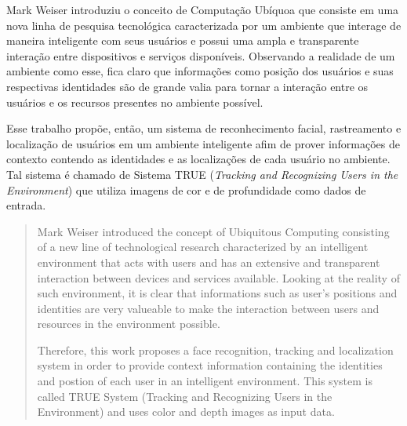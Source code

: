 \begin{resumo}

	Mark Weiser introduziu o conceito de Computação Ubíquoa que consiste em uma nova linha de pesquisa tecnológica caracterizada por um ambiente que interage de maneira inteligente com seus usuários e possui uma ampla e transparente interação entre dispositivos e serviços disponíveis. Observando a realidade de um ambiente como esse, fica claro que informações como posição dos usuários e suas respectivas identidades são de grande valia para tornar a interação entre os usuários e os recursos presentes no ambiente possível.

	Esse trabalho propõe, então, um sistema de reconhecimento facial, rastreamento e localização de usuários em um ambiente inteligente afim de prover informações de contexto contendo as identidades e as localizações de cada usuário no ambiente. Tal sistema é chamado de Sistema TRUE (\textit{Tracking and Recognizing Users in the Environment}) que utiliza imagens de cor e de profundidade como dados de entrada.

\end{resumo}


\begin{abstract}
	
	Mark Weiser introduced the concept of Ubiquitous Computing consisting of a new line of technological research characterized by an intelligent environment that acts with users and has an extensive and transparent interaction between devices and services available. Looking at the reality of such environment, it is clear that informations such as user's positions and identities are very valueable to make the interaction between users and resources in the environment possible.

	Therefore, this work proposes a face recognition, tracking and localization system in order to provide context information containing the identities and postion of each user in an intelligent environment. This system is called TRUE System (Tracking and Recognizing Users in the Environment) and uses color and depth images as input data.

\end{abstract}


